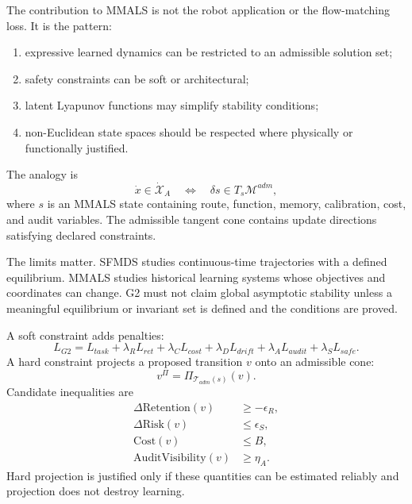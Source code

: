 \documentclass[11pt,a4paper]{article}
\newcommand{\M}{\mathcal{M}}
\begin{document}
The contribution to MMALS is not the robot application or the flow-matching loss. It is the pattern:
\begin{enumerate}
\item expressive learned dynamics can be restricted to an admissible solution set;
\item safety constraints can be soft or architectural;
\item latent Lyapunov functions may simplify stability conditions;
\item non-Euclidean state spaces should be respected where physically or functionally justified.
\end{enumerate}

The analogy is
\begin{equation}
\dot{x}\in\dot{\mathcal{X}}_A
\quad\Longleftrightarrow\quad
\delta s\in T_s\M^{adm},
\end{equation}
where $s$ is an MMALS state containing route, function, memory, calibration, cost, and audit variables. The admissible tangent cone contains update directions satisfying declared constraints.

The limits matter. SFMDS studies continuous-time trajectories with a defined equilibrium. MMALS studies historical learning systems whose objectives and coordinates can change. G2 must not claim global asymptotic stability unless a meaningful equilibrium or invariant set is defined and the conditions are proved.

A soft constraint adds penalties:
\begin{equation}
L_{G2}=L_{task}+\lambda_RL_{ret}+\lambda_CL_{cost}+\lambda_DL_{drift}+\lambda_AL_{audit}+\lambda_SL_{safe}.
\end{equation}
A hard constraint projects a proposed transition $v$ onto an admissible cone:
\begin{equation}
v^{\Pi}=\Pi_{\mathcal{T}_{adm}(s)}(v).
\end{equation}
Candidate inequalities are
\begin{align}
\Delta\mathrm{Retention}(v)&\ge-\epsilon_R,\\
\Delta\mathrm{Risk}(v)&\le\epsilon_S,\\
\mathrm{Cost}(v)&\le B,\\
\mathrm{AuditVisibility}(v)&\ge\eta_A.
\end{align}
Hard projection is justified only if these quantities can be estimated reliably and projection does not destroy learning.
\end{document}

